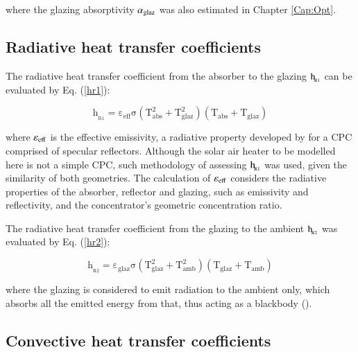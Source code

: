\noindent where the glazing absorptivity $\alpha_{\rm{glaz}}$ was also estimated in Chapter \ref{Cap:Opt}.

\subsection{Radiative heat transfer coefficients}

The radiative heat transfer coefficient from the absorber to the glazing $\rm{h_{\!_{R1}}}$ can be evaluated by Eq. (\ref{hr1}):

\vspace{-0.75cm}
\begin{equation}
\mathrm{{h_{\!_{R1}}} = {\varepsilon _{eff}}\sigma \left( {T_{abs}^2 + T_{glaz}^2} \right)\left( {{T_{abs}} + {T_{glaz}}} \right)}
\label{hr1}
\end{equation}

\noindent where $\rm{\varepsilon_{eff}}$ is the effective emissivity, a radiative property developed by \citet{Rabl1976} for a CPC comprised of specular reflectors. Although the solar air heater to be modelled here is not a simple CPC, such methodology of assessing $\rm{h_{\!_{R1}}}$ was used, given the similarity of both geometries. The calculation of $\rm{\varepsilon_{eff}}$ considers the radiative properties of the absorber, reflector and glazing, such as emissivity and reflectivity, and the concentrator's geometric concentration ratio. 

The radiative heat transfer coefficient from the glazing to the ambient $\rm{h_{\!_{R2}}}$ was evaluated by Eq. (\ref{hr2}):

\vspace{-0.75cm}
\begin{equation}
\mathrm{{h_{\!_{R2}}} = {\varepsilon _{glaz}}\sigma \left( {T_{glaz}^2 + T_{amb}^2} \right)\left( {{T_{glaz}} + {T_{amb}}} \right)}
\label{hr2}
\end{equation}

\noindent where the glazing is considered to emit radiation to the ambient only, which absorbs all the emitted energy from that, thus acting as a blackbody (\cite{Duffie2013}).

\subsection{Convective heat transfer coefficients}

